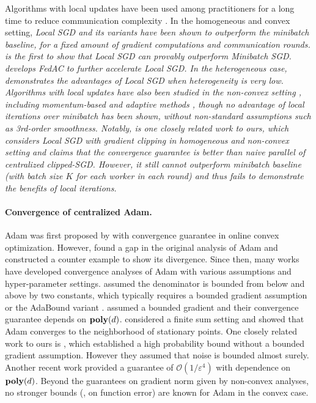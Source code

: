 \documentclass{article} %
\numberwithin{equation}{section}
\begin{document}
Algorithms with local updates have been used among practitioners for a long time to reduce communication complexity \citep{mcmahan2017communication}.
In the homogeneous and convex setting, \em Local \em SGD and its variants have been shown to outperform the minibatch baseline, for a fixed amount of gradient computations and communication rounds.
\cite{woodworth2020local} is the first to show that \em Local \em SGD can provably outperform \em Minibatch \em SGD.
\cite{yuan2020federated} develops FedAC to further accelerate \em Local \em SGD.
In the heterogeneous case, \cite{woodworth2020minibatch} demonstrates the advantages of \em Local \em SGD when heterogeneity is very low. Algorithms with local updates have also been studied in the non-convex setting \citep{karimireddy2020scaffold, yang2021achieving, glasgow2022sharp}, including  momentum-based and adaptive methods \citep{reddi2020adaptive, karimireddy2020mime}, though no advantage of local iterations over minibatch has been shown, without non-standard assumptions such as 3rd-order smoothness.
Notably, \cite{liu2022communication} is one closely related work to ours, which considers \em Local \em SGD with gradient clipping in homogeneous and non-convex setting and claims that the convergence guarantee is better than naive parallel of centralized clipped-SGD.
However, it still cannot outperform minibatch baseline (with batch size $K$ for each worker in each round) and thus fails to demonstrate the benefits of local iterations.

\paragraph{Convergence of centralized Adam.}
Adam was first proposed by \cite{kingma2014adam} with convergence guarantee in online convex optimization.
However, \cite{reddi2019convergence} found a gap in the original analysis of Adam and constructed a counter example to show its divergence.
Since then, many works have developed convergence analyses of Adam with various assumptions and hyper-parameter settings.
\cite{guo2021novel} assumed the denominator is bounded from below and above by two constants, which typically requires a bounded gradient assumption or the AdaBound variant \citep{luo2019adaptive}.
\cite{defossez2020simple} assumed a bounded gradient and their convergence guarantee depends on $\textbf{poly}(d)$.
\cite{zhang2022adam, wang2022provable} considered a finite sum setting and showed that Adam converges to the neighborhood of stationary points.
One closely related work to ours is \citet{li2024convergence}, which established a high probability bound without a bounded gradient assumption.
However they assumed that noise is bounded almost surely. 
Another recent work \citep{wang2024closing} provided a guarantee of $\mathcal{O}\left(1/\varepsilon^4\right)$ with dependence on $\textbf{poly}(d)$.
Beyond the guarantees on gradient norm given by non-convex analyses, no stronger bounds (\eg, on function error) are known for Adam in the convex case.
\end{document}
